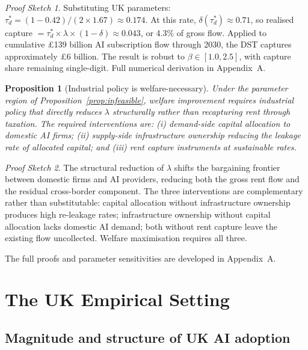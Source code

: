 \documentclass[11pt,letterpaper]{article}
\newtheorem{proposition}{Proposition}
\theoremstyle{remark}
\newtheorem*{proof_sketch}{Proof Sketch}
\begin{document}
\begin{proof_sketch}
Substituting UK parameters: $\tau_d^* = (1 - 0.42)/(2 \times 1.67) \approx 0.174$. At this rate, $\delta(\tau_d^*) \approx 0.71$, so realised capture $= \tau_d^* \times \lambda \times (1 - \delta) \approx 0.043$, or 4.3\% of gross flow. Applied to cumulative \pounds139 billion AI subscription flow through 2030, the DST captures approximately \pounds6 billion. The result is robust to $\beta \in [1.0, 2.5]$, with capture share remaining single-digit. Full numerical derivation in Appendix~A.
\end{proof_sketch}

\begin{proposition}[Industrial policy is welfare-necessary]\label{prop:industrial}
Under the parameter region of Proposition~\ref{prop:infeasible}, welfare improvement requires industrial policy that directly reduces $\lambda$ structurally rather than recapturing rent through taxation. The required interventions are: (i) demand-side capital allocation to domestic {AI} firms; (ii) supply-side infrastructure ownership reducing the leakage rate of allocated capital; and (iii) rent capture instruments at sustainable rates.
\end{proposition}

\begin{proof_sketch}
The structural reduction of $\lambda$ shifts the bargaining frontier between domestic firms and {AI} providers, reducing both the gross rent flow and the residual cross-border component. The three interventions are complementary rather than substitutable: capital allocation without infrastructure ownership produces high re-leakage rates; infrastructure ownership without capital allocation lacks domestic {AI} demand; both without rent capture leave the existing flow uncollected. Welfare maximisation requires all three.
\end{proof_sketch}

The full proofs and parameter sensitivities are developed in Appendix~A.

\section{The {UK} Empirical Setting}

\subsection{Magnitude and structure of {UK} {AI} adoption}
\end{document}
